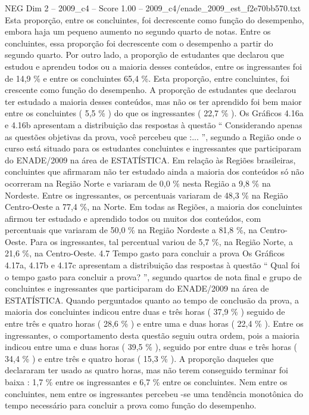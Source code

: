 \begin{textsample}{NEG Dim 2 – 2009\_c4 – Score 1.00 – 2009\_c4/enade\_2009\_est\_f2e70bb570.txt}
Esta proporção, entre os concluintes, foi decrescente como função do desempenho, embora haja um pequeno aumento no segundo quarto de notas.
Entre os concluintes, essa proporção foi decrescente com o desempenho a partir do segundo quarto.
Por outro lado, a proporção de estudantes que declarou que estudou e aprendeu todos ou a maioria desses conteúdos, entre os ingressantes foi de 14,9 \% e entre os concluintes 65,4 \%.
Esta proporção, entre concluintes, foi crescente como função do desempenho.
A proporção de estudantes que declarou ter estudado a maioria desses conteúdos, mas não os ter aprendido foi bem maior entre os concluintes ( 5,5 \% ) do que os ingressantes ( 22,7 \% ).
Os Gráficos 4.16a e 4.16b apresentam a distribuição das respostas à questão “ Considerando apenas as questões objetivas da prova, você percebeu que :... ”, segundo a Região onde o curso está situado para os estudantes concluintes e ingressantes que participaram do ENADE/2009 na área de ESTATÍSTICA.
Em relação às Regiões brasileiras, concluintes que afirmaram não ter estudado ainda a maioria dos conteúdos só não ocorreram na Região Norte e variaram de 0,0 \% nesta Região a 9,8 \% na Nordeste.
Entre os ingressantes, os percentuais variaram de 48,3 \% na Região Centro-Oeste a 77,4 \%, na Norte.
Em todas as Regiões, a maioria dos concluintes afirmou ter estudado e aprendido todos ou muitos dos conteúdos, com percentuais que variaram de 50,0 \% na Região Nordeste a 81,8 \%, na Centro-Oeste.
Para os ingressantes, tal percentual variou de 5,7 \%, na Região Norte, a 21,6 \%, na Centro-Oeste. 4.7 Tempo gasto para concluir a prova Os Gráficos 4.17a, 4.17b e 4.17c apresentam a distribuição das respostas à questão “ Qual foi o tempo gasto para concluir a prova? ”, segundo quartos de nota final e grupo de concluintes e ingressantes que participaram do ENADE/2009 na área de ESTATÍSTICA.
Quando perguntados quanto ao tempo de conclusão da prova, a maioria dos concluintes indicou entre duas e três horas ( 37,9 \% ) seguido de entre três e quatro horas ( 28,6 \% ) e entre uma e duas horas ( 22,4 \% ).
Entre os ingressantes, o comportamento desta questão seguiu outra ordem, pois a maioria indicou entre uma e duas horas ( 39,5 \% ), seguido por entre duas e três horas ( 34,4 \% ) e entre três e quatro horas ( 15,3 \% ).
A proporção daqueles que declararam ter usado as quatro horas, mas não terem conseguido terminar foi baixa : 1,7 \% entre os ingressantes e 6,7 \% entre os concluintes.
Nem entre os concluintes, nem entre os ingressantes percebeu -se uma tendência monotônica do tempo necessário para concluir a prova como função do desempenho.

\end{textsample}
